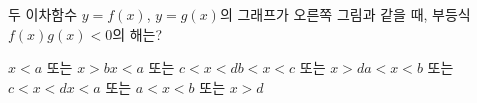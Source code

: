 \noindent\begin{minipage}[t]{0.58\linewidth}\vspace{0pt}\raggedright 두 이차함수 $y=f(x)$, $y=g(x)$의 그래프가 오른쪽 그림과 같을 때, 부등식 $f(x)g(x)<0$의 해는?\end{minipage}\hfill\begin{minipage}[t]{0.4\linewidth}\vspace{0pt}\centering \resizebox{\ifdim\width>\linewidth\linewidth\else\width\fi}{!}{}\end{minipage}\par
\begin{choicesv}{$x<a$ 또는 $x>b$}{$x<a$ 또는 $c<x<d$}{$b<x<c$ 또는 $x>d$}{$a<x<b$ 또는 $c<x<d$}{$x<a$ 또는 $a<x<b$ 또는 $x>d$}\end{choicesv}
